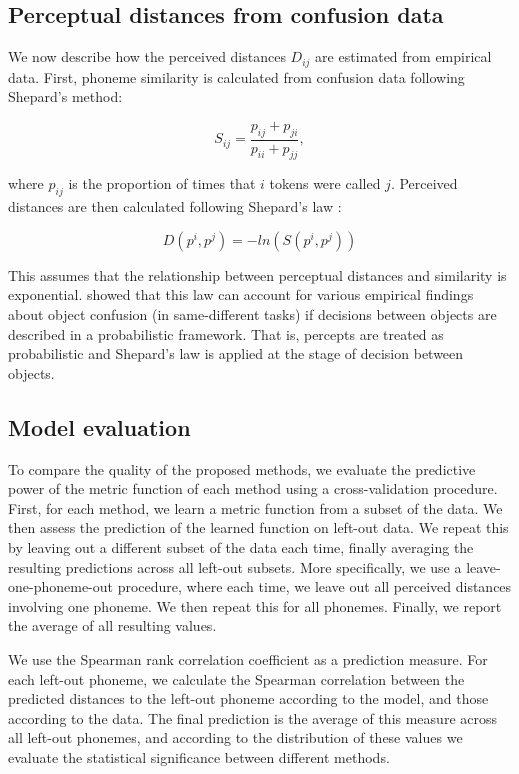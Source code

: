 \subsection{Perceptual distances from confusion data}
We now describe how the perceived distances ${D_{ij}}$ are estimated from empirical data. First, phoneme similarity is calculated from confusion data following Shepard's method:

\begin{equation}
    S_{ij}=\frac{p_{ij}+p_{ji}}{p_{ii}+p_{jj}},
\end{equation}

where $p_{ij}$ is the proportion of times that $i$ tokens were called $j$. Perceived distances are then calculated following Shepard's law \citep{Shepard1987, Johnson2004}:

\begin{equation}
    D(p^i, p^j) = -ln(S(p^i, p^j))
\end{equation}

This assumes that the relationship between perceptual distances and similarity is exponential. \citet{Ennis1988} showed that this law can account for various empirical findings about object confusion (in same-different tasks) if decisions between objects are described in a probabilistic framework. That is, percepts are treated as probabilistic and Shepard's law is applied at the stage of decision between objects.

\subsection{Model evaluation}
To compare the quality of the proposed methods, we evaluate the predictive power of the metric function of each method using a cross-validation procedure. First, for each method, we learn a metric function from a subset of the data. We then assess the prediction of the learned function on left-out data. We repeat this by leaving out a different subset of the data each time, finally averaging the resulting predictions across all left-out subsets. More specifically, we use a leave-one-phoneme-out procedure, where each time, we leave out all perceived distances involving one phoneme. We then repeat this for all phonemes. Finally, we report the average of all resulting values. 

We use the Spearman rank correlation coefficient as a prediction measure. For each left-out phoneme, we calculate the Spearman correlation between the predicted distances to the left-out phoneme according to the model, and those according to the data. The final prediction is the average of this measure across all left-out phonemes, and according to the distribution of these values we evaluate the statistical significance between different methods.

